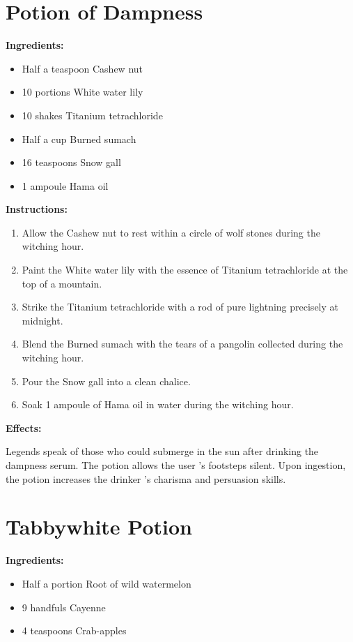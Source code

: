 \documentclass{article}
\begin{document}
\newpage
\section*{Potion of Dampness}

\textbf{Ingredients:}

\begin{itemize}
  \item Half a teaspoon Cashew nut
  \item 10 portions White water lily
  \item 10 shakes Titanium tetrachloride
  \item Half a cup Burned sumach
  \item 16 teaspoons Snow gall
  \item 1 ampoule Hama oil
\end{itemize}

\textbf{Instructions:}

\begin{enumerate}
  \item Allow the Cashew nut to rest within a circle of wolf stones during the witching hour.
  \item Paint the White water lily with the essence of Titanium tetrachloride at the top of a mountain.
  \item Strike the Titanium tetrachloride with a rod of pure lightning precisely at midnight.
  \item Blend the Burned sumach with the tears of a pangolin collected during the witching hour.
  \item Pour the Snow gall into a clean chalice.
  \item Soak 1 ampoule of Hama oil in water during the witching hour.
\end{enumerate}

\textbf{Effects:}

Legends speak of those who could submerge in the sun after drinking the dampness serum. The potion allows the user 's footsteps silent. Upon ingestion, the potion increases the drinker 's charisma and persuasion skills.

\newpage
\section*{Tabbywhite Potion}

\textbf{Ingredients:}

\begin{itemize}
  \item Half a portion Root of wild watermelon
  \item 9 handfuls Cayenne
  \item 4 teaspoons Crab-apples
\end{itemize}
\end{document}
